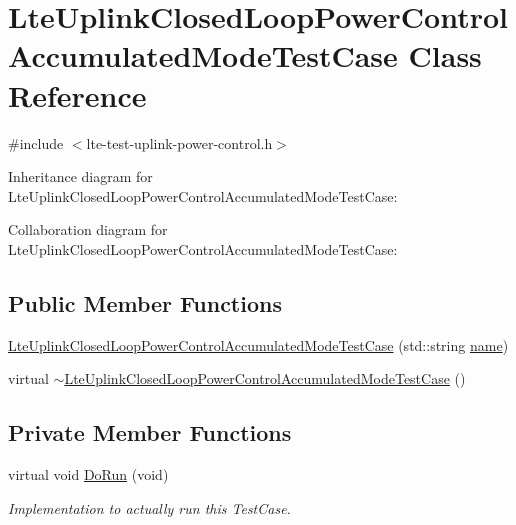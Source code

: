\hypertarget{classLteUplinkClosedLoopPowerControlAccumulatedModeTestCase}{}\section{Lte\+Uplink\+Closed\+Loop\+Power\+Control\+Accumulated\+Mode\+Test\+Case Class Reference}
\label{classLteUplinkClosedLoopPowerControlAccumulatedModeTestCase}


{\ttfamily \#include $<$lte-\/test-\/uplink-\/power-\/control.\+h$>$}



Inheritance diagram for Lte\+Uplink\+Closed\+Loop\+Power\+Control\+Accumulated\+Mode\+Test\+Case\+:


Collaboration diagram for Lte\+Uplink\+Closed\+Loop\+Power\+Control\+Accumulated\+Mode\+Test\+Case\+:
\subsection*{Public Member Functions}
\begin{DoxyCompactItemize}
\item 
\hyperlink{classLteUplinkClosedLoopPowerControlAccumulatedModeTestCase_a6dcd56aa0b116a9d7affccbc6f907aee}{Lte\+Uplink\+Closed\+Loop\+Power\+Control\+Accumulated\+Mode\+Test\+Case} (std\+::string \hyperlink{generate__test__data__lte__spectrum__model_8m_ab74e6bf80237ddc4109968cedc58c151}{name})
\item 
virtual \hyperlink{classLteUplinkClosedLoopPowerControlAccumulatedModeTestCase_aad848fa7274dab1f152592e99f201d28}{$\sim$\+Lte\+Uplink\+Closed\+Loop\+Power\+Control\+Accumulated\+Mode\+Test\+Case} ()
\end{DoxyCompactItemize}
\subsection*{Private Member Functions}
\begin{DoxyCompactItemize}
\item 
virtual void \hyperlink{classLteUplinkClosedLoopPowerControlAccumulatedModeTestCase_aefa91ec44dabd2bed1558fce70290da9}{Do\+Run} (void)
\begin{DoxyCompactList}\small\item\em Implementation to actually run this Test\+Case. \end{DoxyCompactList}\end{DoxyCompactItemize}
